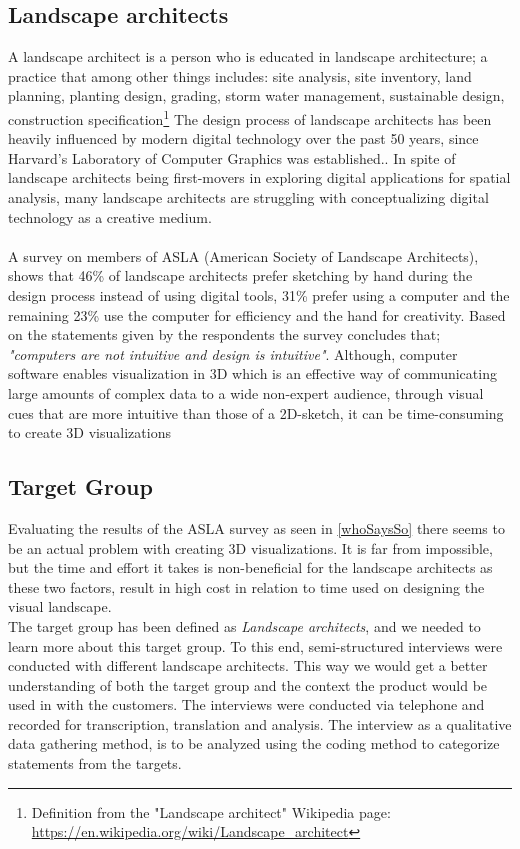  	\subsection{Landscape architects}\label{whoSaysSo}
 	A landscape architect is a person who is educated in landscape architecture; a practice that among other things includes: site analysis, site inventory, land planning, planting design, grading, storm water management, sustainable design, construction specification\footnote{Definition from the "Landscape architect" Wikipedia page: \url{https://en.wikipedia.org/wiki/Landscape\_architect}}
 	The design process of landscape architects has been heavily influenced by modern digital technology over the past 50 years, since Harvard's Laboratory of Computer Graphics was established.\cite{landscapeArchitectureDigiTech}. In spite of landscape architects being first-movers in exploring digital applications for spatial analysis, many landscape architects are struggling with conceptualizing digital technology as a creative medium\cite{landscapeArchitectureDigiTech}. \\
 	\\
 	A survey on members of ASLA (American Society of Landscape Architects)\cite{surveySketchVSDigital}, shows that 46\% of landscape architects prefer sketching by hand during the design process instead of using digital tools, 31\% prefer using a computer and the remaining 23\% use the computer for efficiency and the hand for creativity. Based on the statements given by the respondents the survey concludes that; \textit{"computers are not intuitive and design is intuitive"}\cite{landscapeArchitectureDigiTech}\cite{surveySketchVSDigital}. Although, computer software enables visualization in 3D which is an effective way of communicating large amounts of complex data to a wide non-expert audience, through visual cues that are more intuitive than those of a 2D-sketch, it can be time-consuming to create 3D visualizations\cite{landscapeVisual}
		
	\subsection{Target Group}\label{sec:targetGroup}
	Evaluating the results of the ASLA survey as seen in \autoref{whoSaysSo} there seems to be an actual problem with creating 3D visualizations. It is far from impossible, but the time and effort it takes is non-beneficial for the landscape architects as these two factors, result in high cost in relation to time used on designing the visual landscape. \\
	The target group has been defined as \textit{Landscape architects}, and we needed to learn more about this target group. To this end, semi-structured interviews were conducted with different landscape architects. This way we would get a better understanding of both the target group and the context the product would be used in with the customers. The interviews were conducted via telephone and recorded for transcription, translation and analysis. The interview as a qualitative data gathering method, is to be analyzed using the coding method to categorize statements from the targets.
	
